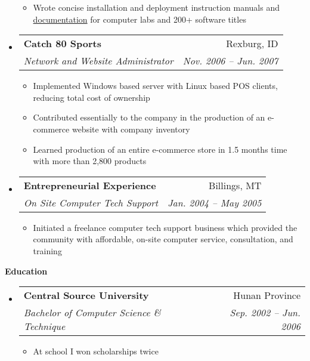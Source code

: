 \documentclass[letterpaper,11pt]{article}
\makeatletter
\newcommand{\resitem}[1]{\item #1 \vspace{-2pt}}
\newcommand{\resheading}[1]{{\large \colorbox{mygrey}{\begin{minipage}{\textwidth}{\textbf{#1 \vphantom{p\^{E}}}}\end{minipage}}}}
\newcommand{\ressubheading}[4]{
\begin{tabular*}{6.5in}{l@{\extracolsep{\fill}}r}
		\textbf{#1} & #2 \\
		\textit{#3} & \textit{#4} \\
\end{tabular*}\vspace{-6pt}}
\makeatother
\begin{document}
\begin{itemize}
{\begin{itemize}
      \resitem{Wrote concise installation and deployment instruction manuals and \href{http://www.derekhildreth.com/portfolio/Documentation/Lab_Binder_Documentation_BYUI_Work.pdf}{documentation} for computer labs and 200+ software titles}

    \end{itemize}
  }

\item \ressubheading{Catch 80 Sports}{Rexburg, ID}{Network and Website Administrator}{Nov. 2006 -- Jun. 2007}
  { \footnotesize
    \begin{itemize}
      \resitem{Implemented Windows based server with Linux based POS clients, reducing total cost of ownership}

      \resitem{Contributed essentially to the company in the production of an e-commerce website with company inventory}

      \resitem{Learned production of an entire e-commerce store in 1.5 months time with more than 2,800 products}

    \end{itemize}
  }

\item \ressubheading{Entrepreneurial Experience}{Billings, MT}{On Site Computer Tech Support}{Jan. 2004 -- May 2005}
  { \footnotesize				
    \begin{itemize}
    \item Initiated a freelance computer tech support business which provided the community with affordable, on-site computer service, consultation, and training
    \end{itemize}
  }

\end{itemize}  %

\resheading{Education}
\begin{itemize}
\item \ressubheading{Central Source University}{Hunan Province}{%
    Bachelor of Computer Science \& Technique}{Sep. 2002 -- Jun. 2006}

  { \footnotesize
    \begin{itemize}
      \resitem{At school I won scholarships twice}
    \end{itemize}
  }

\end{itemize} %
\end{document}
